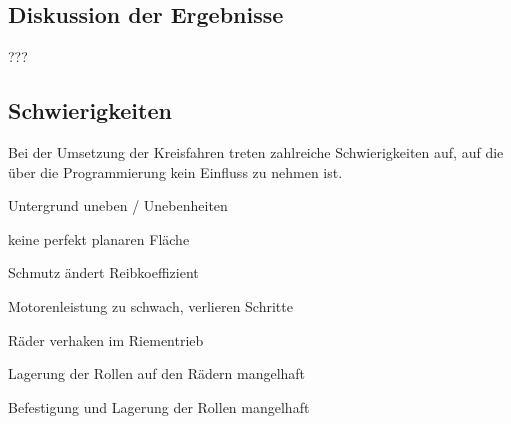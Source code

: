 \documentclass[a4paper]{article}
\begin{document}
\subsection{Diskussion der Ergebnisse}
???

\subsection{Schwierigkeiten}
Bei der Umsetzung der Kreisfahren treten zahlreiche Schwierigkeiten auf, auf die über die Programmierung kein Einfluss zu nehmen ist.
\begin{compactitem}
    \item Untergrund uneben / Unebenheiten
    \item keine perfekt planaren Fläche
    \item Schmutz ändert Reibkoeffizient
    \item Motorenleistung zu schwach, verlieren Schritte
    \item Räder verhaken im Riementrieb
    \item Lagerung der Rollen auf den Rädern mangelhaft
    \item Befestigung und Lagerung der Rollen mangelhaft
\end{compactitem}
\end{document}
